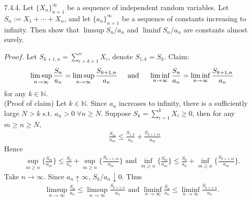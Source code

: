 \begin{exercise}7.4.4.
Let $\{X_n\}^\infty_{n=1}$ be a sequence of independent random variables. Let $S_n := X_1 +\cdots+ X_n$, and let $\{a_n\}^\infty_{n=1}$ be a sequence of constants increasing to infinity. Then show that $\limsup S_n/a_n$ and $\liminf S_n/a_n$ are constants almost surely.
\end{exercise}
\begin{answer}
$Proof.$ Let $S_{k+1,n}=\sum_{i=k+1}^n X_i$, denote $S_{1,k}=S_k$. Claim:
\begin{equation*}
    \limsup_{n\rightarrow\infty}\frac{S_n}{a_n}=\limsup_{n\rightarrow\infty}\frac{S_{k+1,n}}{a_n}\hspace{0.5cm}\text{and}\hspace{0.5cm}\liminf_{n\rightarrow\infty}\frac{S_n}{a_n}=\liminf_{n\rightarrow\infty}\frac{S_{k+1,n}}{a_n}
\end{equation*} for any $k\in\mathbb{N}$.\\
(Proof of claim) Let $k\in\mathbb{N}$. Since $a_n$ increases to infinity, there is a sufficiently large $N>k$ s.t. $a_n>0\;\forall n\geq N$. Suppose $S_{k}=\sum_{i=1}^k X_i\geq 0$, then for any $m\geq n\geq N$,
\begin{equation*}
    \begin{aligned}
        &\frac{S_m}{a_m}\leq\frac{S_{1,k}}{a_n}+\frac{S_{k+1,m}}{a_m}
    \end{aligned}
\end{equation*}
Hence
\begin{equation*}
    \begin{aligned}
        \sup_{m\geq n}\Big\{\frac{S_m}{a_m}\Big\}\leq\frac{S_{k}}{a_n}+\sup_{m\geq n}\Big\{\frac{S_{k+1,m}}{a_m}\Big\}\text{ and }\inf_{m\geq n}\Big\{\frac{S_m}{a_m}\Big\}\leq\frac{S_{k}}{a_n}+\inf_{m\geq n}\Big\{\frac{S_{k+1,m}}{a_m}\Big\}.
    \end{aligned}
\end{equation*}
Take $n\rightarrow\infty$. Since $a_n\uparrow\infty$, $S_k/a_n\downarrow 0$. Thus
\begin{equation*}
    \begin{aligned}
        \limsup_{n\rightarrow\infty}\frac{S_n}{a_n}\leq\limsup_{n\rightarrow\infty}\frac{S_{k+1,n}}{a_n}\text{ and }\liminf_{n\rightarrow\infty}\frac{S_n}{a_n}\leq\liminf_{n\rightarrow\infty}\frac{S_{k+1,n}}{a_n}.
    \end{aligned}

\end{equation*}
\end{answer}

